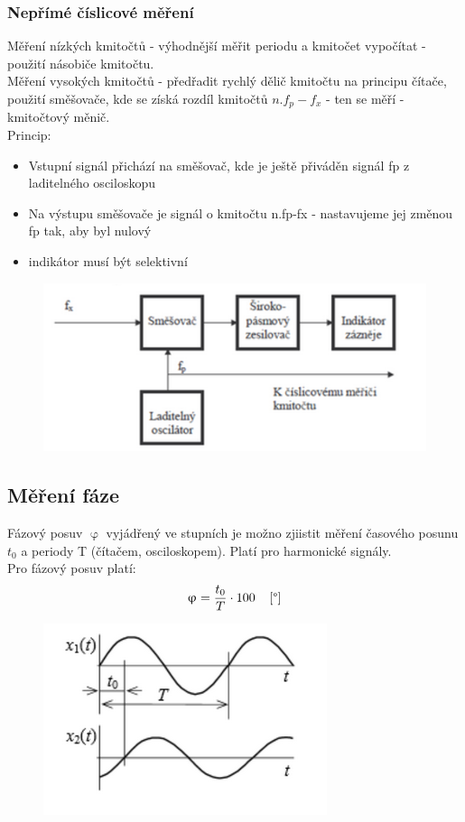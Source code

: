 \subsubsection*{Nepřímé číslicové měření}
Měření nízkých kmitočtů - výhodnější měřit periodu a kmitočet vypočítat - použití násobiče kmitočtu.\\
Měření vysokých kmitočtů - předřadit rychlý dělič kmitočtu na principu čítače, použití směšovače, kde se získá rozdíl kmitočtů $n.f_p - f_x$ - ten se měří - kmitočtový měnič.\\
Princip:
\begin{itemize}
    \item Vstupní signál přichází na směšovač, kde je ještě přiváděn signál fp z laditelného osciloskopu 
    \item Na výstupu směšovače je signál o kmitočtu n.fp-fx - nastavujeme jej změnou fp tak, aby byl nulový
    \item indikátor musí být selektivní
\end{itemize}
\begin{figure}[H]
    \includegraphics*[scale = 1]{images/NeprimeCislicoveMereni.png}
\end{figure}

\subsection*{Měření fáze}
Fázový posuv $\upvarphi $ vyjádřený ve stupních je možno zjiistit měření časového posunu $t_0$ a periody T (čítačem, osciloskopem). Platí pro harmonické signály.\\
Pro fázový posuv platí:
\begin{equation}
    \upvarphi = \frac{t_0}{T}\cdot 100 \;\;\;\; [\degree]
\end{equation}
\begin{figure}[H]
    \includegraphics*[scale = 1]{images/faze.png}
\end{figure}

